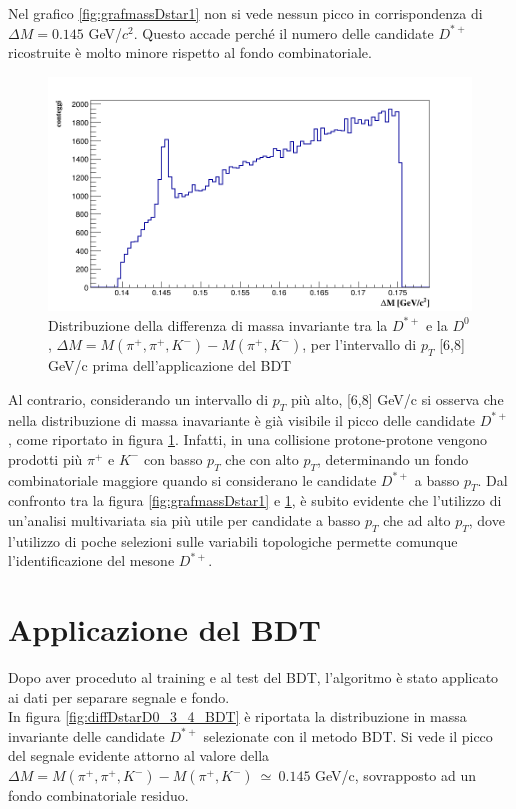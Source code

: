 Nel grafico \ref{fig:grafmassDstar1} non si vede nessun picco in corrispondenza di $\Delta M = 0.145$ GeV/$c^2$. Questo accade perché il numero delle candidate $D^{*+}$ ricostruite è molto minore rispetto al fondo combinatoriale.
    \begin{figure}[htbp]
        \centering
        \includegraphics[width=0.7\linewidth]{AnalisiDati/dati_6_8.png}
        \caption{Distribuzione della differenza di massa invariante tra la $D^{*+}$ e la $D^0$, $\Delta M = M(\pi^+,\pi^+,K^-) - M(\pi^+,K^-)$, per l'intervallo di $p_T$ [6,8] GeV/c prima dell'applicazione del BDT}
        \label{fig:grafmassDstar2}
    \end{figure}

Al contrario, considerando un intervallo di $p_T$ pi\`u alto, [6,8] GeV/c si osserva che nella distribuzione di massa inavariante \`e gi\`a visibile il picco delle candidate $D^{*+}$, come riportato in figura \ref{fig:grafmassDstar2}. Infatti, in una collisione protone-protone vengono prodotti pi\`u $\pi^+$ e $K^-$ con basso $p_T$ che con alto $p_T$, determinando un fondo combinatoriale maggiore quando si considerano le candidate $D^{*+}$ a basso $p_T$. Dal confronto tra la figura \ref{fig:grafmassDstar1} e \ref{fig:grafmassDstar2}, \`e subito evidente che l'utilizzo di un'analisi multivariata sia pi\`u utile per candidate a basso $p_T$ che ad alto $p_T$, dove l'utilizzo di poche selezioni sulle variabili topologiche permette comunque l'identificazione del mesone $D^{*+}$.

\section{Applicazione del BDT} \label{applicazione}
Dopo aver proceduto al training e al test del BDT, l'algoritmo \`e stato applicato ai dati per separare segnale e fondo.
\\In figura \ref{fig:diffDstarD0_3_4_BDT} è riportata la distribuzione in massa invariante delle candidate $D^{*+}$ selezionate con il metodo BDT. Si vede il picco del segnale evidente attorno al valore della $ \Delta M = M(\pi^+,\pi^+,K^-) - M(\pi^+,K^-) \ \simeq \ 0.145$ GeV/c, sovrapposto ad un fondo combinatoriale residuo.


